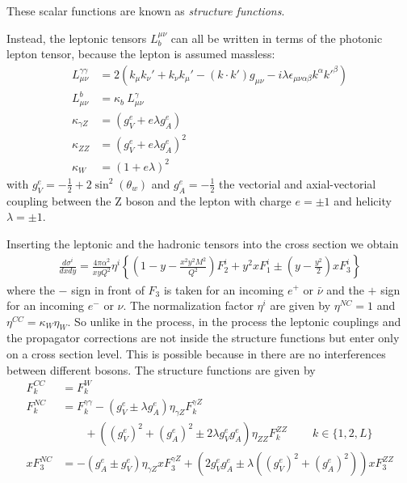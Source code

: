 These scalar functions are known as \dis \textit{structure functions}.

Instead, the leptonic tensors $L_b^{\mu\nu}$ can all be written in terms of the photonic
lepton tensor, because the lepton is assumed massless:
\begin{align}
    L^{\gamma\gamma}_{\mu\nu} &= 2\left(k_{\mu}k_{\nu}' + k_{\nu}k_{\mu}' - (k\cdot k') g_{\mu\nu} - i\lambda \epsilon_{\mu\nu\alpha\beta}k^{\alpha}k'^{\beta}\right)\\
    L^{b}_{\mu\nu} &= \kappa_b ~ L^{\gamma}_{\mu\nu}\\
    \kappa_{\gamma Z} &= (g_V^e + e\lambda g_A^e)\\
    \kappa_{ZZ} &= (g_V^e + e\lambda g_A^e)^2\\
    \kappa_{W} &= (1 + e\lambda)^2
\end{align}
with $g_V^e = -\frac 1 2 + 2\sin^2(\theta_w)$ and $g_A^e = -\frac 1 2$ the
vectorial and axial-vectorial coupling between the Z boson and the lepton with
charge $e=\pm 1$ and helicity $\lambda=\pm 1$.

Inserting the leptonic and the hadronic tensors into the cross section we obtain
\begin{align}
    \frac{d\sigma^i}{dx dy} = \frac{4\pi \alpha^2}{x y Q^2} \eta^i \left\{
    \left(1-y - \frac{x^2 y^2 M^2}{Q^2}\right)F_2^i
    + y^2 x F_1^i
    \pm \left(y - \frac {y^2}{2} \right) x F_3^i
    \right\}
\end{align}
where the $-$ sign in front of $F_3$ is taken for an incoming $e^+$ or
$\bar \nu$ and the $+$ sign for an incoming $e^-$ or $\nu$.
The normalization factor $\eta^i$ are given by $\eta^{NC} = 1$ and $\eta^{CC} =
\kappa_W \eta_W$. So unlike in the \nc process, in the \cc process the leptonic
couplings and the propagator corrections are not inside the structure functions
but enter only on a cross section level. 
This is possible because in \cc there are no interferences between different bosons. 
The structure functions are given by
\begin{align}
    F_k^{CC} &= F_k^W\\
    F_k^{NC} &= F_k^{\gamma\gamma} - (g_V^e \pm \lambda g_A^e) \eta_{\gamma Z} F_k^{\gamma Z} \nonumber\\
             &\qquad + \left((g_V^e)^2 + (g_A^e)^2  \pm 2 \lambda g_V^e g_A^e \right) 
             \eta_{ZZ} F_k^{ZZ} \qquad~ k\in\{1,2,L\} \\
    x F_3^{NC} &= -(g_A^e \pm g_V^e) \eta_{\gamma Z} x F_3^{\gamma Z}
    + \left(2g_V^e g_A^e \pm \lambda((g_V^e)^2 + (g_A^e)^2)\right) x F_3^{ZZ}
\end{align}

